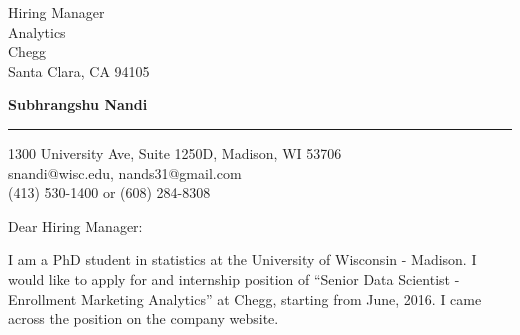 \documentclass{letter} %
\begin{document}
\signature{Subhrangshu Nandi}           %
\longindentation=0pt                    %
\let\raggedleft\raggedright            %
 
 
\begin{letter}
{Hiring Manager \\
Analytics \\
Chegg \\
Santa Clara, CA 94105
}


\begin{flushleft}
{\bf Subhrangshu Nandi}
\end{flushleft}
\medskip\hrule height 1pt
\begin{flushright}
\hfill 1300 University Ave, Suite 1250D, Madison, WI 53706 \\
\hfill snandi@wisc.edu, nands31@gmail.com\\
\hfill (413) 530-1400 or (608) 284-8308
\end{flushright} 
\vfill %

\opening{Dear Hiring Manager:} 
 
\noindent %
I am a PhD student in statistics at the University of Wisconsin - Madison. I would like to apply for and internship position of ``Senior Data Scientist - Enrollment Marketing Analytics'' at Chegg, starting from June, 2016. I came across the position on the company website.
 

\end{letter}
\end{document}
